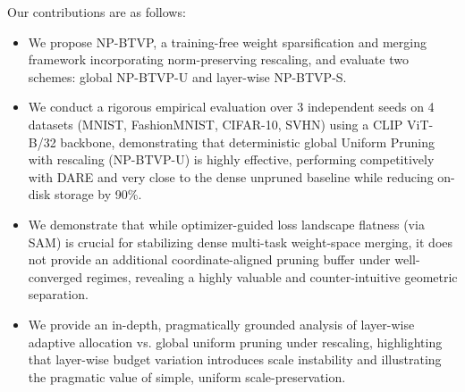 Our contributions are as follows:
\begin{itemize}
    \item We propose NP-BTVP, a training-free weight sparsification and merging framework incorporating norm-preserving rescaling, and evaluate two schemes: global NP-BTVP-U and layer-wise NP-BTVP-S.
    \item We conduct a rigorous empirical evaluation over 3 independent seeds on 4 datasets (MNIST, FashionMNIST, CIFAR-10, SVHN) using a CLIP ViT-B/32 backbone, demonstrating that deterministic global Uniform Pruning with rescaling (NP-BTVP-U) is highly effective, performing competitively with DARE and very close to the dense unpruned baseline while reducing on-disk storage by 90\%.
    \item We demonstrate that while optimizer-guided loss landscape flatness (via SAM) is crucial for stabilizing dense multi-task weight-space merging, it does not provide an additional coordinate-aligned pruning buffer under well-converged regimes, revealing a highly valuable and counter-intuitive geometric separation.
    \item We provide an in-depth, pragmatically grounded analysis of layer-wise adaptive allocation vs. global uniform pruning under rescaling, highlighting that layer-wise budget variation introduces scale instability and illustrating the pragmatic value of simple, uniform scale-preservation.
\end{itemize}